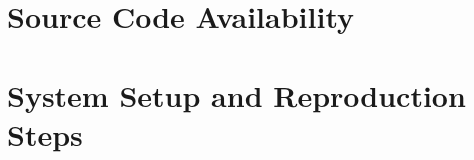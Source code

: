 ﻿\appendix

\chapter{Source Code Availability}


\chapter{System Setup and Reproduction Steps}
\label{app:setup}

